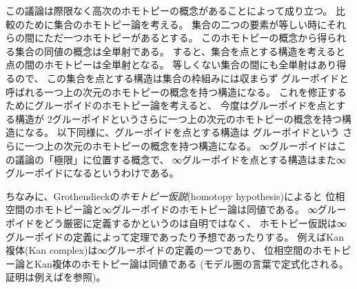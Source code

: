\documentclass[index]{subfiles}
\begin{document}
この議論は際限なく高次のホモトピーの概念があることによって成り立つ。
比較のために集合のホモトピー論を考える。
集合の二つの要素が等しい時にそれらの間にただ一つホモトピーがあるとする。
このホモトピーの概念から得られる集合の同値の概念は全単射である。
すると、集合を点とする構造を考えると点の間のホモトピーは全単射となる。
等しくない集合の間にも全単射はあり得るので、
この集合を点とする構造は集合の枠組みには収まらず
グルーポイドと呼ばれる一つ上の次元のホモトピーの概念を持つ構造になる。
これを修正するためにグルーポイドのホモトピー論を考えると、
今度はグルーポイドを点とする構造が
2グルーポイドというさらに一つ上の次元のホモトピーの概念を持つ構造になる。
以下同様に、グルーポイドを点とする構造は
グルーポイドという
さらに一つ上の次元のホモトピーの概念を持つ構造になる。
∞グルーポイドはこの議論の「極限」に位置する概念で、
∞グルーポイドを点とする構造はまた∞グルーポイドになるというわけである。

ちなみに、Grothendieckの\emph{ホモトピー仮説}(homotopy hypothesis)によると
位相空間のホモトピー論と∞グルーポイドのホモトピー論は同値である。
∞グルーポイドをどう厳密に定義するかというのは自明ではなく、
ホモトピー仮説は∞グルーポイドの定義によって定理であったり予想であったりする。
例えばKan複体(Kan complex)は∞グルーポイドの定義の一つであり、
位相空間のホモトピー論とKan複体のホモトピー論は同値である
(モデル圏の言葉で定式化される。
証明は例えばを参照)。
\end{document}
